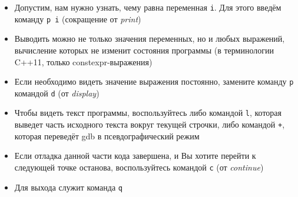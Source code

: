 \documentclass{beamer}
\begin{document}
\begin{frame}
	\begin{itemize}
		\item{Допустим, нам нужно узнать, чему равна переменная \texttt{i}. Для этого введём команду \texttt{p i} (сокращение от \emph{print})}\pause
		\item{Выводить можно не только значения переменных, но и любых выражений, вычисление которых не изменит состояния программы (в терминологии C++11, только constexpr-выражения)}\pause
		\item{Если необходимо видеть значение выражения постоянно, замените команду \texttt{p} командой \texttt{d} (от \emph{display})}\pause
		\item{Чтобы видеть текст программы, воспользуйтесь либо командой \texttt{l}, которая выведет часть исходного текста вокруг текущей строчки, либо командой \texttt{+}, которая переведёт gdb в псевдографический режим}\pause
		\item{Если отладка данной части кода завершена, и Вы хотите перейти к следующей точке останова, воспользуйтесь командой \texttt{c} (от \emph{continue})}\pause
		\item{Для выхода служит команда \texttt{q}}
	\end{itemize}
\end{frame}
	
\end{document}
